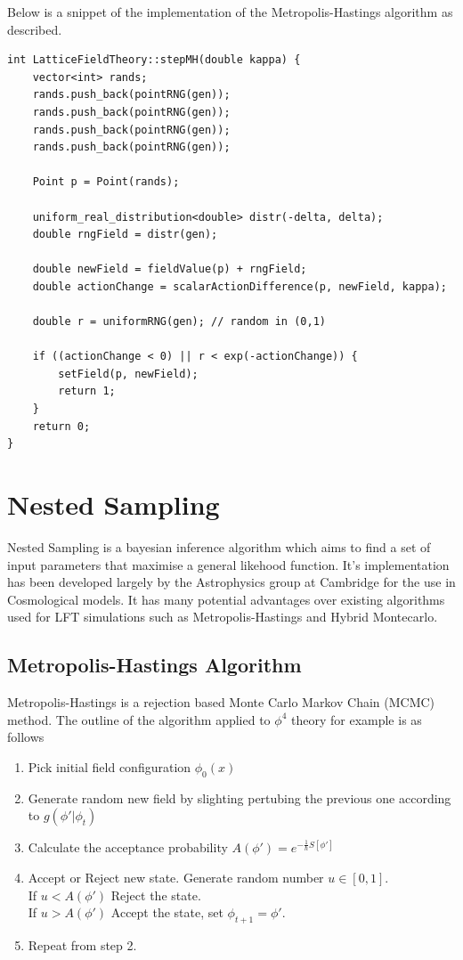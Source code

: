 \documentclass[a4paper]{article}
\begin{document}
    Below is a snippet of the implementation of the
    Metropolis-Hastings algorithm as described.
\begin{lstlisting}
int LatticeFieldTheory::stepMH(double kappa) {
    vector<int> rands;
    rands.push_back(pointRNG(gen));
    rands.push_back(pointRNG(gen));
    rands.push_back(pointRNG(gen));
    rands.push_back(pointRNG(gen));

    Point p = Point(rands);

    uniform_real_distribution<double> distr(-delta, delta);
    double rngField = distr(gen);

    double newField = fieldValue(p) + rngField;
    double actionChange = scalarActionDifference(p, newField, kappa);

    double r = uniformRNG(gen); // random in (0,1)

    if ((actionChange < 0) || r < exp(-actionChange)) {
        setField(p, newField);
        return 1;
    }
    return 0;
}
\end{lstlisting}

    
    \section{Nested Sampling}
    Nested Sampling is a bayesian inference algorithm which aims to
    find a set of input parameters that maximise a general likehood function. 
    It's implementation has been
    developed largely by the Astrophysics group at Cambridge for the
    use in Cosmological models. It has many potential advantages over existing algorithms used for LFT
    simulations such as Metropolis-Hastings\cite{2} and Hybrid
    Montecarlo.

    \subsection{Metropolis-Hastings Algorithm}
    Metropolis-Hastings is a rejection based Monte Carlo Markov Chain
    (MCMC) method. The outline of the algorithm applied to $\phi^4$
    theory for example is as follows
    \begin{enumerate}
      \item Pick initial field configuration $\phi_0(x)$
      \item Generate random new field by slighting pertubing the
        previous one according to $g(\phi' | \phi_t)$
      \item Calculate the acceptance probability $A(\phi') =
        e^{-\frac{1}{\hbar}S[\phi']}$
      \item Accept or Reject new state. Generate random number $u \in
        [0,1]$. \\
        If $u < A(\phi')$ Reject the state. \\
        If $u > A(\phi')$ Accept the state, set $\phi_{t+1} = \phi'$.
        \item Repeat from step 2.
      \end{enumerate}
\end{document}
